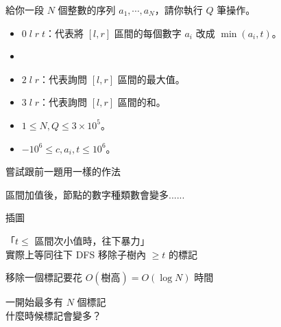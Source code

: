 \begin{frame}{}
    \begin{problem}
        給你一段 $N$ 個整數的序列 $a_1,\cdots,a_N$，請你執行 $Q$ 筆操作。

        \begin{itemize}
            \item $0\;l\;r\;t$：代表將 $[l,r]$ 區間的每個數字 $a_i$ 改成 $\min(a_i,t)$。
            \item {}
            \item $2\;l\;r$：代表詢問 $[l,r]$ 區間的最大值。
            \item $3\;l\;r$：代表詢問 $[l,r]$ 區間的和。
        \end{itemize}

        \begin{itemize}
            \item $1\le N,Q\le 3\times 10^5$。
            \item $-10^6\le c,a_i,t\le 10^6$。
        \end{itemize}
    \end{problem}
\end{frame}

\begin{frame}{}
    嘗試跟前一題用一樣的作法

    區間加值後，節點的數字種類數會變多......\\


\end{frame}

\begin{frame}{}
    \todo 插圖
\end{frame}

\begin{frame}{}
    「$t \leq$ 區間次小值時，往下暴力」\\
    實際上等同往下 DFS 移除子樹內 $\geq t$ 的標記

     {
        移除一個標記要花 $O(\text{樹高}) = O(\log N)$ 時間

        一開始最多有 $N$ 個標記 \\
        什麼時候標記會變多？
    }
\end{frame}

